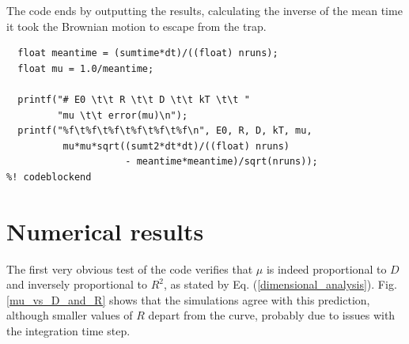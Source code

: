 \documentclass{article}
\begin{document}
The code ends by outputting the results, calculating the inverse of the mean
time it took the Brownian motion to escape from the trap.

\begin{lstlisting}[frame=single]
%! codeblock: output_results
  float meantime = (sumtime*dt)/((float) nruns);
  float mu = 1.0/meantime;

  printf("# E0 \t\t R \t\t D \t\t kT \t\t "
         "mu \t\t error(mu)\n");
  printf("%f\t%f\t%f\t%f\t%f\t%f\n", E0, R, D, kT, mu,
          mu*mu*sqrt((sumt2*dt*dt)/((float) nruns)
                     - meantime*meantime)/sqrt(nruns));
%! codeblockend
\end{lstlisting}


\section{Numerical results}

The first very obvious test of the code verifies that $\mu$ is indeed
proportional to $D$ and inversely proportional to $R^2$, as stated by Eq.
(\ref{dimensional_analysis}). Fig. \ref{mu_vs_D_and_R} shows that the
simulations agree with this prediction, although smaller values of $R$
depart from the curve, probably due to issues with the integration time
step.

\end{document}
